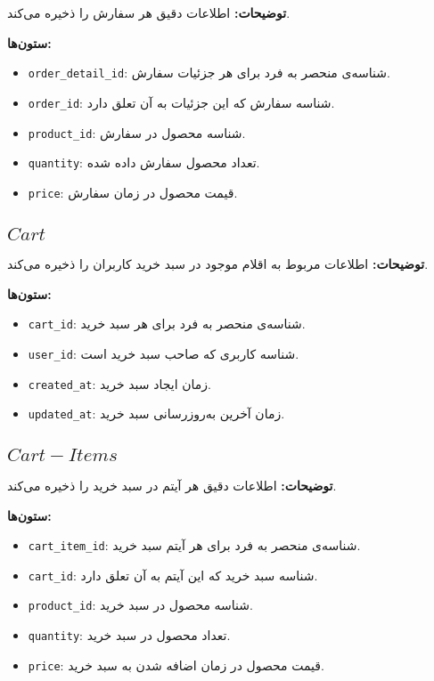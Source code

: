 \documentclass[12pt]{article}
\begin{document}
\textbf{توضیحات:} اطلاعات دقیق هر سفارش را ذخیره می‌کند.

\textbf{ستون‌ها:}
\begin{itemize}
    \item \texttt{order\_detail\_id}: شناسه‌ی منحصر به فرد برای هر جزئیات سفارش.
    \item \texttt{order\_id}: شناسه سفارش که این جزئیات به آن تعلق دارد.
    \item \texttt{product\_id}: شناسه محصول در سفارش.
    \item \texttt{quantity}: تعداد محصول سفارش داده شده.
    \item \texttt{price}: قیمت محصول در زمان سفارش.
\end{itemize}

\subsection{\(Cart\)}

\textbf{توضیحات:} اطلاعات مربوط به اقلام موجود در سبد خرید کاربران را ذخیره می‌کند.

\textbf{ستون‌ها:}
\begin{itemize}
    \item \texttt{cart\_id}: شناسه‌ی منحصر به فرد برای هر سبد خرید.
    \item \texttt{user\_id}: شناسه کاربری که صاحب سبد خرید است.
    \item \texttt{created\_at}: زمان ایجاد سبد خرید.
    \item \texttt{updated\_at}: زمان آخرین به‌روزرسانی سبد خرید.
\end{itemize}

\subsection{\(Cart-Items\)}

\textbf{توضیحات:} اطلاعات دقیق هر آیتم در سبد خرید را ذخیره می‌کند.

\textbf{ستون‌ها:}
\begin{itemize}
    \item \texttt{cart\_item\_id}: شناسه‌ی منحصر به فرد برای هر آیتم سبد خرید.
    \item \texttt{cart\_id}: شناسه سبد خرید که این آیتم به آن تعلق دارد.
    \item \texttt{product\_id}: شناسه محصول در سبد خرید.
    \item \texttt{quantity}: تعداد محصول در سبد خرید.
    \item \texttt{price}: قیمت محصول در زمان اضافه شدن به سبد خرید.
\end{itemize}
\end{document}
